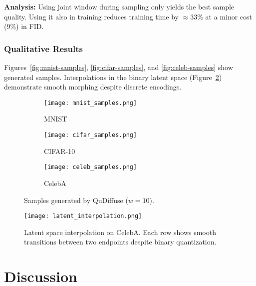 \documentclass[11pt,letterpaper]{article}
\begin{document}
\noindent\textbf{Analysis:} Using joint window during sampling only yields the best sample quality. Using it also in training reduces training time by $\approx 33\%$ at a minor cost (\raisebox{0.2ex}{$\approx$}9\%) in FID.

\subsubsection{Qualitative Results}
Figures~\ref{fig:mnist-samples}, \ref{fig:cifar-samples}, and \ref{fig:celeb-samples} show generated samples. Interpolations in the binary latent space (Figure~\ref{fig:latent-interp}) demonstrate smooth morphing despite discrete encodings.

\begin{figure}[H]
    \centering
    \begin{subfigure}{0.32\linewidth}
      \texttt{[image: mnist\_samples.png]}
      \caption{MNIST}
    \end{subfigure}
    \begin{subfigure}{0.32\linewidth}
      \texttt{[image: cifar\_samples.png]}
      \caption{CIFAR-10}
    \end{subfigure}
    \begin{subfigure}{0.32\linewidth}
      \texttt{[image: celeb\_samples.png]}
      \caption{CelebA}
    \end{subfigure}
    \caption{Samples generated by QuDiffuse ($w=10$).}
    \label{fig:generated-samples}
\end{figure}

\begin{figure}[H]
    \centering
    \texttt{[image: latent\_interpolation.png]}
    \caption{Latent space interpolation on CelebA. Each row shows smooth transitions between two endpoints despite binary quantization.}
    \label{fig:latent-interp}
\end{figure}

\section{Discussion}
\label{sec:discussion}
\end{document}
